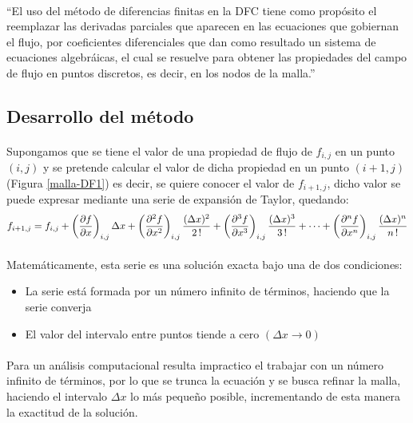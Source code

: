 \documentclass[letterpaper, openright, 12pt]{book}
\begin{document}
	\paragraph*{}
	``El uso del método de diferencias finitas en la DFC tiene como propósito el reemplazar las derivadas parciales que aparecen en las ecuaciones que gobiernan el flujo, por coeficientes diferenciales que dan como resultado un sistema de ecuaciones algebráicas, el cual se resuelve para obtener las propiedades del campo de flujo en puntos discretos, es decir, en los nodos de la malla.'' \cite{anderson-yotros}
	
	\subsection{Desarrollo del método}
	\paragraph*{}
	Supongamos que se tiene el valor de una propiedad de flujo de $f_{i,j}$ en un punto $(i,j)$ y se pretende calcular el valor de dicha propiedad en un punto $(i+1,j)$ (Figura \ref{malla-DF1}) es decir, se quiere conocer el valor de $f_{i+1,j}$, dicho valor se puede expresar mediante una serie de expansión de Taylor, quedando:
	\begin{equation}
	f_{i+1,j} = f_{i,j} + \left(\pdv{f}{x} \right)_{i,j} \Delta x + \left( \pdv[2]{f}{x} \right)_{i,j} \frac{(\Delta x)^2}{2\,!} + \left(\pdv[3]{f}{x} \right)_{i,j} \frac{ (\Delta x)^3 }{3\,!} + \dotsb + \left( \pdv[n]{f}{x} \right)_{i,j} \frac{ (\Delta x)^n }{n\,!}
	\label{taylor-forward}
	\end{equation}
	
	\paragraph*{}
	Matemáticamente, esta serie es una solución exacta bajo una de dos condiciones:
	\begin{itemize}
		\item La serie está formada por un número infinito de términos, haciendo que la serie converja
		\item El valor del intervalo entre puntos tiende a cero $(\Delta x \rightarrow 0)$
	\end{itemize}
	
	\paragraph*{}
	Para un análisis computacional resulta impractico el trabajar con un número infinito de términos, por lo que se trunca la ecuación y se busca refinar la malla, haciendo el intervalo $\Delta x$ lo más pequeño posible, incrementando de esta manera la exactitud de la solución.
	
\end{document}
